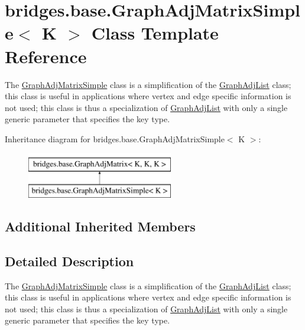 \hypertarget{classbridges_1_1base_1_1_graph_adj_matrix_simple}{}\section{bridges.\+base.\+Graph\+Adj\+Matrix\+Simple$<$ K $>$ Class Template Reference}
\label{classbridges_1_1base_1_1_graph_adj_matrix_simple}


The \hyperlink{classbridges_1_1base_1_1_graph_adj_matrix_simple}{Graph\+Adj\+Matrix\+Simple} class is a simplification of the \hyperlink{classbridges_1_1base_1_1_graph_adj_list}{Graph\+Adj\+List} class; this class is useful in applications where vertex and edge specific information is not used; this class is thus a specialization of \hyperlink{classbridges_1_1base_1_1_graph_adj_list}{Graph\+Adj\+List} with only a single generic parameter that specifies the key type.  


Inheritance diagram for bridges.\+base.\+Graph\+Adj\+Matrix\+Simple$<$ K $>$\+:\begin{figure}[H]
\begin{center}
\leavevmode
\includegraphics[height=2.000000cm]{classbridges_1_1base_1_1_graph_adj_matrix_simple}
\end{center}
\end{figure}
\subsection*{Additional Inherited Members}


\subsection{Detailed Description}
The \hyperlink{classbridges_1_1base_1_1_graph_adj_matrix_simple}{Graph\+Adj\+Matrix\+Simple} class is a simplification of the \hyperlink{classbridges_1_1base_1_1_graph_adj_list}{Graph\+Adj\+List} class; this class is useful in applications where vertex and edge specific information is not used; this class is thus a specialization of \hyperlink{classbridges_1_1base_1_1_graph_adj_list}{Graph\+Adj\+List} with only a single generic parameter that specifies the key type. 

